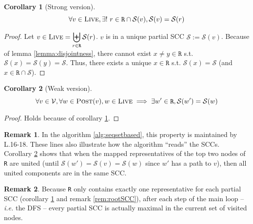 \documentclass[a4 paper, 12pt]{article}
\theoremstyle{definition}
\newtheorem{corollary}{Corollary}[lemma]
\newtheorem{remark}{Remark}
\begin{document}
\begin{corollary}[Strong version]\label{cor:cor1}
    \begin{equation*}
        \forall v \in \textsc{Live}, \exists!~r \in \texttt{R} \cap \mathcal{S}(v), \mathcal{S}(v) = \mathcal{S}(r)
    \end{equation*}
\end{corollary}
\begin{proof}
    Let $v \in \textsc{Live} = \displaystyle{\biguplus_{r \in \texttt{R}} \mathcal{S}(r)}$. $v$ is in a unique partial SCC $\mathscr{S} := \mathcal{S}(v)$. Because of lemma \ref{lemma:disjointness}, there cannot exist $x \neq y \in \texttt{R}$ s.t. $\mathcal{S}(x) = \mathcal{S}(y) = \mathscr{S}$. Thus, there exists a unique $x \in \texttt{R}$ s.t. $\mathcal{S}(x) = \mathscr{S}$ (and $x\in \texttt{R} \cap \mathscr{S}$).
\end{proof}

\begin{corollary}[Weak version]\label{cor:cor2}
    \begin{equation*}
        \forall v \in \mathcal{V}, \forall w \in \textsc{Post}(v), w \in \textsc{Live} \implies \exists w' \in \texttt{R}, \mathcal{S}(w') = \mathcal{S}(w)
    \end{equation*}
\end{corollary}

\begin{proof}
    Holds because of corollary \ref{cor:cor1}.
\end{proof}

\begin{remark}
    In the algorithm \ref{alg:seqsetbased}, this property is maintained by L.16-18. These lines also illustrate how the algorithm ``reads'' the SCCs. Corollary \ref{cor:cor2} shows that when the mapped representatives of the top two nodes of \texttt{R} are united (until $\mathcal{S}(w') = \mathcal{S}(v) = \mathcal{S}(w)$ since $w'$ has a path to $v$), then all united components are in the same SCC.
\end{remark}

\begin{remark}\label{rem:proof}
    Because \texttt{R} only contains exactly one representative for each partial SCC (corollary \ref{cor:cor1} and remark \ref{rem:rootSCC}), after each step of the main loop -- \textit{i.e.} the DFS -- every partial SCC is actually maximal in the current set of visited nodes.
\end{remark}
\end{document}
